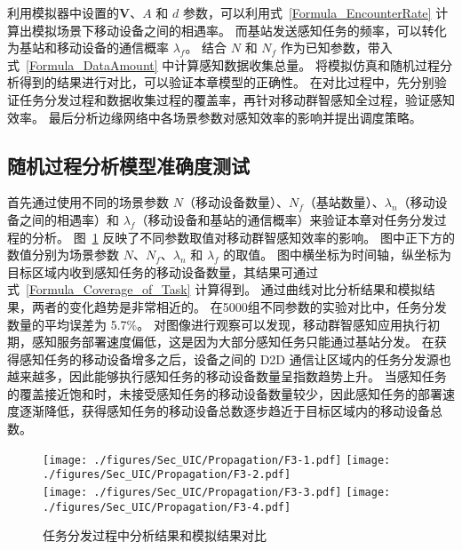 利用模拟器中设置的$\boldsymbol{V}$、$A$ 和 $d$ 参数，可以利用式~\eqref{Formula_EncounterRate} 计算出模拟场景下移动设备之间的相遇率。
而基站发送感知任务的频率，可以转化为基站和移动设备的通信概率 $\lambda_f$。
结合 $N$ 和 $N_f$ 作为已知参数，带入式~\eqref{Formula_DataAmount} 中计算感知数据收集总量。
将模拟仿真和随机过程分析得到的结果进行对比，可以验证本章模型的正确性。
在对比过程中，先分别验证任务分发过程和数据收集过程的覆盖率，再针对移动群智感知全过程，验证感知效率。
最后分析边缘网络中各场景参数对感知效率的影响并提出调度策略。


\subsection{随机过程分析模型准确度测试}

首先通过使用不同的场景参数 $N$（移动设备数量）、$N_f$（基站数量）、$\lambda_n$（移动设备之间的相遇率）和 $\lambda_f$（移动设备和基站的通信概率）来验证本章对任务分发过程的分析。
图~\ref{Figure_PropagationTest} 反映了不同参数取值对移动群智感知效率的影响。
图中正下方的数值分别为场景参数 $N$、$N_f$、$\lambda_n$ 和 $\lambda_f$ 的取值。
图中横坐标为时间轴，纵坐标为目标区域内收到感知任务的移动设备数量，其结果可通过式~\eqref{Formula_Coverage_of_Task} 计算得到。
通过曲线对比分析结果和模拟结果，两者的变化趋势是非常相近的。
在5000组不同参数的实验对比中，任务分发数量的平均误差为 5.7\%。
对图像进行观察可以发现，移动群智感知应用执行初期，感知服务部署速度偏低，这是因为大部分感知任务只能通过基站分发。
在获得感知任务的移动设备增多之后，设备之间的 D2D 通信让区域内的任务分发源也越来越多，因此能够执行感知任务的移动设备数量呈指数趋势上升。
当感知任务的覆盖接近饱和时，未接受感知任务的移动设备数量较少，因此感知任务的部署速度逐渐降低，获得感知任务的移动设备总数逐步趋近于目标区域内的移动设备总数。

\begin{figure}[!h]
  \centering
  {\texttt{[image: ./figures/Sec\_UIC/Propagation/F3-1.pdf]}}
  {\texttt{[image: ./figures/Sec\_UIC/Propagation/F3-2.pdf]}}\\
  {\texttt{[image: ./figures/Sec\_UIC/Propagation/F3-3.pdf]}}
  {\texttt{[image: ./figures/Sec\_UIC/Propagation/F3-4.pdf]}}
  \vspace{-0.5em}
  \caption{任务分发过程中分析结果和模拟结果对比}
  \vspace{-0.5em}
  \label{Figure_PropagationTest}
\end{figure}


